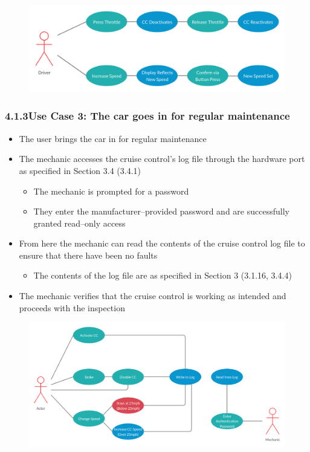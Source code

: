 \documentclass{article}
\begin{document}
	\begin{figure}[!htb]
		\centering
		\includegraphics[scale=0.184]{UseCase2}
	\end{figure}
	\newpage
	\subsubsection*{4.1.3\quad Use Case 3: The car goes in for regular maintenance}
	\begin{itemize}
		\item The user brings the car in for regular maintenance
		\item The mechanic accesses the cruise control's log file through the hardware port as specified in Section 3.4 (3.4.1)
		\begin{itemize}
			\item The mechanic is prompted for a password
			\item They enter the manufacturer--provided password and are successfully granted read--only access
		\end{itemize}
		\item From here the mechanic can read the contents of the cruise control log file to ensure that there have been no faults
		\begin{itemize}
			\item The contents of the log file are as specified in Section 3 (3.1.16, 3.4.4)
		\end{itemize}
		\item The mechanic verifies that the cruise control is working as intended and proceeds with the inspection
	\end{itemize}
	
	\begin{figure}[!htb]
		\centering
		\includegraphics[scale=0.184]{UseCase3}
	\end{figure}
	\newpage
\end{document}
